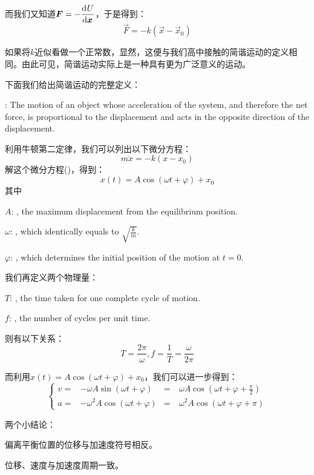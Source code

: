 而我们又知道$\vec{F}=-\D[]{U}{\vec{x}}$，于是得到：
\[
    \vec{F}=-k(\vec{x}-\vec{x}_0)
\]

如果将$k$近似看做一个正常数，显然，这便与我们高中接触的简谐运动的定义相同。由此可见，简谐运动实际上是一种具有更为广泛意义的运动。

下面我们给出简谐运动的完整定义：
\begin{Itemize}
    \item {}: The motion of an object whose acceleration of the system, and therefore the net force, is proportional to the displacement and acts in the opposite direction of the displacement.
\end{Itemize}

利用牛顿第二定律，我们可以列出以下微分方程：
\[m\ddot{x}=-k(x-x_0)\]
解这个微分方程()，得到：
\[x(t)=A\cos(\omega t+\varphi)+x_0\]
其中
\begin{Itemize}
    \item $A$: , the maximum displacement from the equilibrium position.
    \item $\omega$: , which identically equals to $\sqrt{\frac{k}{m}}$.
    \item $\varphi$: , which determines the initial position of the motion at $t=0$.
\end{Itemize}

我们再定义两个物理量：
\begin{Itemize}
    \item $T$: , the time taken for one complete cycle of motion.
    \item $f$: , the number of cycles per unit time.
\end{Itemize}
则有以下关系：
\[T=\frac{2\pi}{\omega},f=\frac{1}{T}=\frac{\omega}{2\pi}\]

而利用$x(t)=A\cos(\omega t+\varphi)+x_0$，我们可以进一步得到：
\[
    \left\{
    \begin{aligned}
        v= & -\omega A\sin(\omega t+\varphi)   & = & \ \omega A\cos(\omega t+\varphi+\frac{\pi}{2}) \\
        a= & -\omega^2 A\cos(\omega t+\varphi) & = & \ \omega^2 A\cos(\omega t+\varphi+\pi)
    \end{aligned}
    \right.
\]

两个小结论：
\begin{Itemize}
    \item 偏离平衡位置的位移与加速度符号相反。
    \item 位移、速度与加速度周期一致。
\end{Itemize}

